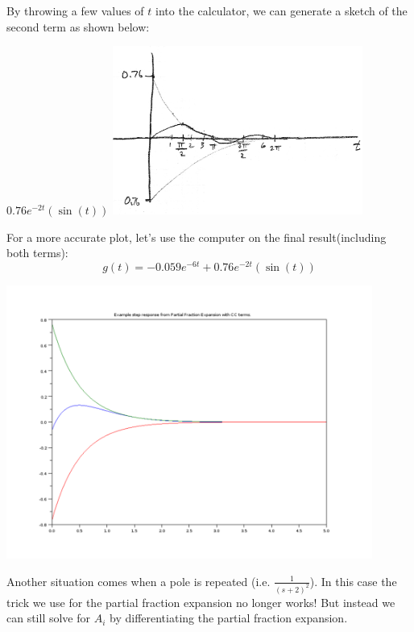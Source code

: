 \begin{ExampleCont}
By throwing a few values of $t$ into the calculator, we can generate a sketch of the second term as shown below:

$ 0.76e^{-2t} \left (  \sin(t)  \right )$ \hspace{0.25in}\includegraphics[width=82mm]{figs01/00805a.png}

For a more accurate plot, let's use the computer on the final result(including both terms):
\[
g(t) = -0.059e^{-6t} + 0.76e^{-2t} \left (  \sin(t)  \right )
\]

\includegraphics[width=120mm]{figs01/pf_compConja.png}


\end{ExampleCont}


Another situation comes when a pole is repeated (i.e. $\frac{1}{(s+2)^2}$).  In this case the trick we use for the partial fraction expansion no longer works!   But instead we can still solve for $A_i$ by differentiating the partial fraction expansion.

